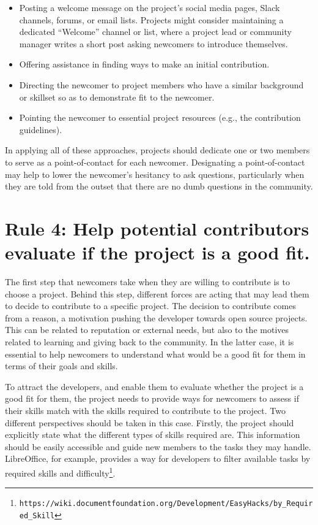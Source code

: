 \documentclass[10pt,letterpaper]{article}
\newcommand{\rulemajor}[1]{\section*{#1}}
\newcommand{\withurl}[2]{{#1}\footnote{{\texttt{#2}}}}
\begin{document}
\begin{itemize}

\item
  Posting a welcome message on the project's social media pages, Slack channels, forums, or email lists.
  Projects might consider maintaining a dedicated ``Welcome'' channel or list,
  where a project lead or community manager writes a short post asking newcomers to introduce themselves.

\item
  Offering assistance in finding ways to make an initial contribution.

\item
  Directing the newcomer to project members who have a similar background or skillset
  so as to demonstrate fit to the newcomer.

\item
  Pointing the newcomer to essential project resources (e.g., the contribution guidelines).

\end{itemize}

In applying all of these approaches,
projects should dedicate one or two members to serve as a point-of-contact for each newcomer.
Designating a point-of-contact may help to lower the newcomer's hesitancy to ask questions,
particularly when they are told from the outset that there are no dumb questions in the community.

\rulemajor{Rule 4: Help potential contributors evaluate if the project is a good fit.}

The first step that newcomers take when they are willing to contribute is to choose a project.
Behind this step,
different forces are acting that may lead them to decide to contribute to a specific project.
The decision to contribute comes from a reason,
a motivation pushing the developer towards open source projects.
This can be related to reputation or external needs,
but also to the motives related to learning and giving back to the community.
In the latter case,
it is essential to help newcomers to understand what would be a good fit for them in terms of their goals and skills.

To attract the developers,
and enable them to evaluate whether the project is a good fit for them,
the project needs to provide ways for newcomers to assess if their skills match with the skills required to contribute to the project.
Two different perspectives should be taken in this case.
Firstly,
the project should explicitly state what the different types of skills required are.
This information should be easily accessible and guide new members to the tasks they may handle.
LibreOffice,
for example,
provides a way for developers to filter available tasks by
\withurl{required skills and difficulty}{https://wiki.documentfoundation.org/Development/EasyHacks/by\_Required\_Skill}.
\end{document}
